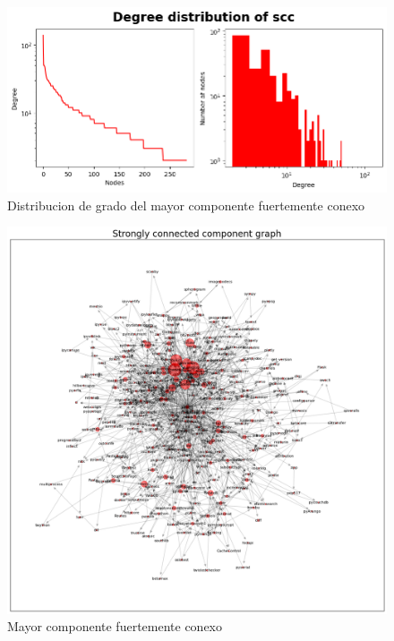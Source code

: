 \begin{figure}[h!]
    \begin{center}
        \includegraphics[width=1\textwidth]{img/pypi/scc1_dist.png}
        \caption{Distribucion de grado del mayor componente fuertemente conexo}
    \end{center}
\end{figure}

\begin{figure}[h!]
    \begin{center}
        \includegraphics[width=1.2\textwidth]{img/pypi/scc1.png}
        \caption{Mayor componente fuertemente conexo}
    \end{center}
\end{figure}


